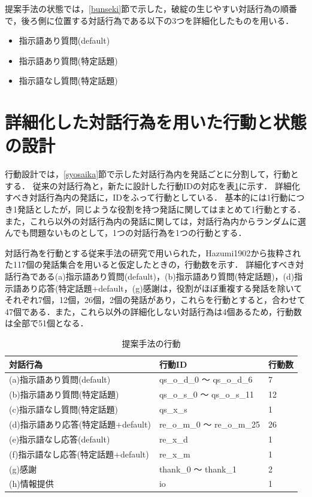 \documentclass[12pt,a4paper,twoside,openany]{jbook}
\begin{document}
提案手法の状態では，\ref{bunseki}節で示した，破綻の生じやすい対話行為の順番で，後ろ側に位置する対話行為である以下の3つを詳細化したものを用いる．
\begin{itemize}
\item 指示語あり質問(default)
\item 指示語あり質問(特定話題)
\item 指示語なし質問(特定話題)
\end{itemize}

\section{詳細化した対話行為を用いた行動と状態の設計}\label{jyotaikodo}

行動設計では，\ref{syosaika}節で示した対話行為内を発話ごとに分割して，行動とする．
従来の対話行為と，新たに設計した行動IDの対応を表\ref{kodohyo}に示す．
詳細化すべき対話行為内の発話に，IDをふって行動としている．
基本的には1行動につき1発話としたが，同じような役割を持つ発話に関してはまとめて1行動とする．
また，これら以外の対話行為内の発話に関しては，対話行為内からランダムに選んでも問題ないものとして，1つの対話行為を1つの行動とする．


対話行為を行動とする従来手法の研究\cite{nishimoto2}で用いられた，Hazumi1902\cite{hazumi}から抜粋された117個の発話集合を用いると仮定したときの，行動数を示す．
詳細化すべき対話行為である(a)指示語あり質問(default)，(b)指示語あり質問(特定話題)，(d)指示語あり応答(特定話題+default，(g)感謝は，役割がほぼ重複する発話を除いてそれぞれ7個，12個，26個，2個の発話があり，これらを行動とすると，合わせて47個である．また，これら以外の詳細化しない対話行為は4個あるため，行動数は全部で51個となる．

\begin{table}[tb]
    \caption{提案手法の行動}\label{kodohyo}
    \centering
    \begin{tabular}{|l|l|l|}\hline 
         対話行為&行動ID&行動数  \\ \hline \hline
         (a)指示語あり質問(default)&qs\_o\_d\_0 ～ qs\_o\_d\_6 &7\\ \hline
         (b)指示語あり質問(特定話題)&qs\_o\_s\_0 ～ qs\_o\_s\_11 &12\\ \hline
         (c)指示語なし質問(特定話題)&qs\_x\_s &1 \\ \hline
         (d)指示語あり応答(特定話題+default)&re\_o\_m\_0 ～ re\_o\_m\_25 &26\\ \hline
         (e)指示語なし応答(default)&re\_x\_d &1\\ \hline
         (f)指示語なし応答(特定話題+default)&re\_x\_m &1\\ \hline
         (g)感謝 &thank\_0 ～ thank\_1 &2\\ \hline
         (h)情報提供&io &1\\ \hline
    \end{tabular}
\end{table}
\end{document}
